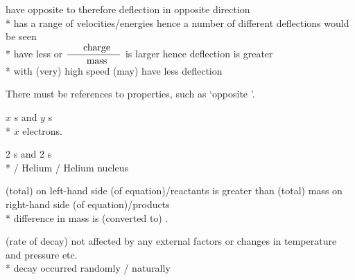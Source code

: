 \begin{question}%
  \label{q:a-experiment-2}%

  \ce{\beta} have opposite  to \ce{\alpha} therefore deflection in opposite direction~\hfill{}\\*
  \ce{\beta} has a range of velocities/energies hence a number of different deflections would be seen~\hfill{}\\*
  \ce{\beta} have less  or $\frac{\text{\refterm{charge}}}{\text{\refterm{mass}}}$ is larger hence deflection is greater \\*
  \OR \ce{\beta} with (very) high speed (may) have less deflection~\hfill{}

  There must be references to properties, such as `opposite '.
\end{question}

\begin{question}%

  $x$ s and $y$ s~\hfill{}\\*
  \NOT $x$ electrons.
\end{question}

\begin{question}%

  2 s and 2 s~\hfill{}\\*
  \NOT {} / Helium / Helium nucleus
\end{question}

\begin{question}%

  (total)  on left-hand side (of equation)/reactants is greater than (total) mass on right-hand side (of equation)/products~\hfill{}\\*
  difference in mass is (converted to) .\hfill{}
\end{question}

\begin{question}%

  (rate of decay) not affected by any external factors or changes in temperature and pressure etc.~\hfill{}\\*
  \NOT decay occurred randomly / naturally
\end{question}
